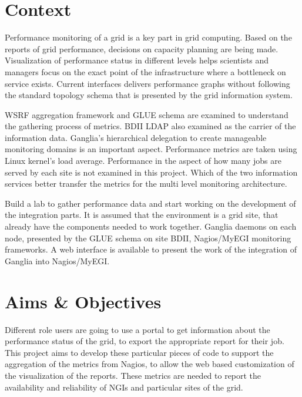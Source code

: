 \section{Context}

Performance monitoring of a grid is a key part in grid computing. Based on the reports of grid performance, decisions on capacity planning are being made. Visualization of performance status in different levels helps scientists and managers focus on the exact point of the infrastructure where a bottleneck on service exists.
Current interfaces delivers performance graphs without following the standard topology schema that is presented by the grid information system.

WSRF aggregation framework and GLUE schema are examined to understand the gathering process of metrics. BDII LDAP also examined as the carrier of the information data. Ganglia's hierarchical delegation to create manageable monitoring domains is an important aspect. Performance metrics are taken using Linux kernel's load average.
Performance in the aspect of how many jobs are served by each site is not examined in this project.
Which of the two information services better transfer the metrics for the multi level monitoring architecture.

Build a lab to gather performance data and start working on the development of the integration parts.
It is assumed that the environment is a grid site, that already have the components needed to work together. Ganglia daemons on each node, presented by the GLUE schema on site BDII, Nagios/MyEGI monitoring frameworks.
A web interface is available to present the work of the integration of Ganglia into Nagios/MyEGI.


\section{Aims \& Objectives}

Different role users are going to use a portal to get information about the performance status of the grid, to export the appropriate report for their job. This project aims to develop these particular pieces of code to support the aggregation of the metrics from Nagios, to allow the web based customization of the visualization of the reports. These metrics are needed to report the availability and reliability of NGIs and particular sites of the grid.

